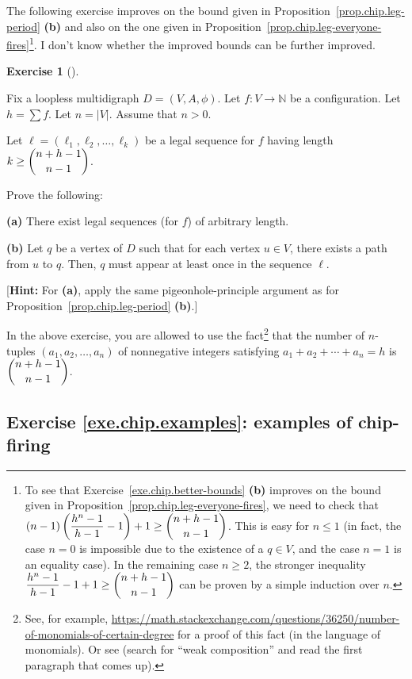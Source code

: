 \documentclass[numbers=enddot,12pt,final,onecolumn,notitlepage]{scrartcl}%
\newcounter{exer}
\theoremstyle{definition}
\newtheorem{exmp}[exer]{Exercise}
\newenvironment{exercise}[1][]
{\begin{exmp}[#1]\begin{leftbar}}
{\end{leftbar}\end{exmp}}
\let\sumnonlimits\sum
\renewcommand{\sum}{\sumnonlimits\limits}
\newcommand{\NN}{\mathbb{N}}
\newcommand{\abs}[1]{\left| #1 \right|}
\newcommand{\tup}[1]{\left( #1 \right)}
\begin{document}
The following exercise improves on the bound given in
Proposition~\ref{prop.chip.leg-period} \textbf{(b)} and
also on the one given in
Proposition~\ref{prop.chip.leg-everyone-fires}\footnote{To
  see that Exercise~\ref{exe.chip.better-bounds} \textbf{(b)}
  improves on the bound given in
  Proposition~\ref{prop.chip.leg-everyone-fires},
  we need to check that
  $\tup{n-1} \tup{ \dfrac{h^n-1}{h-1} - 1} + 1
  \geq \dbinom{n+h-1}{n-1}$.
  This is easy for $n \leq 1$ (in fact, the case
  $n = 0$ is impossible due to the existence of a
  $q \in V$, and the case $n = 1$ is an equality
  case).
  In the remaining case $n \geq 2$,
  the stronger inequality
  $\dfrac{h^n-1}{h-1} - 1 + 1
  \geq \dbinom{n+h-1}{n-1}$
  can be proven by a simple induction
  over $n$.}.
I don't know whether the improved bounds can be further
improved.

\begin{exercise} \label{exe.chip.better-bounds}
Fix a loopless multidigraph $D = \tup{V, A, \phi}$.
Let $f : V \to \NN$ be a configuration.
Let $h = \sum f$.
Let $n = \abs{V}$.
Assume that $n > 0$.

Let $\ell = \tup{\ell_1, \ell_2, \ldots, \ell_k}$ be a
legal sequence for $f$ having length
$k \geq \dbinom{n+h-1}{n-1}$.

Prove the following:

\textbf{(a)} There exist legal sequences (for $f$) of
arbitrary length.

\textbf{(b)} Let $q$ be a vertex of $D$ such that for each vertex
$u \in V$, there exists a path from $u$ to $q$.
Then, $q$ must appear at least once in the sequence $\ell$.

[\textbf{Hint:}
For \textbf{(a)}, apply the same pigeonhole-principle argument
as for Proposition~\ref{prop.chip.leg-period} \textbf{(b)}.]
\end{exercise}

In the above exercise,
you are allowed to use the fact\footnote{See, for example,
  \url{https://math.stackexchange.com/questions/36250/number-of-monomials-of-certain-degree}
  for a proof of this fact (in the language of monomials).
  Or see \cite[\S 1.2]{Stanle11} (search for
  ``weak composition'' and read the first paragraph that
  comes up).}
that the number of
$n$-tuples $\tup{a_1, a_2, \ldots, a_n}$ of nonnegative
integers satisfying $a_1 + a_2 + \cdots + a_n = h$
is $\dbinom{n+h-1}{n-1}$.

\subsection{Exercise \ref{exe.chip.examples}: examples of chip-firing}
\end{document}
